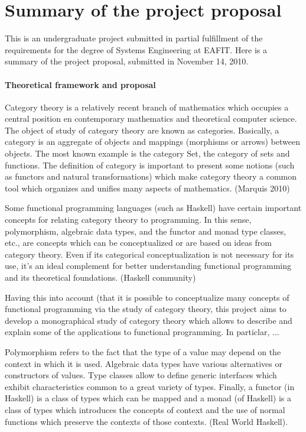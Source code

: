 \section*{Summary of the project proposal}

This is an undergraduate project submitted in partial fulfillment of
the requirements for the degree of Systems Engineering at EAFIT. Here
is a summary of the project proposal, submitted in November 14, 2010.

\paragraph{Theoretical framework and proposal}

Category theory is a relatively recent branch of mathematics which
occupies a central position en contemporary mathematics and
theoretical computer science. The object of study of category theory
are known as categories. Basically, a category is an aggregate of
objects and mappings (morphisms or arrows) between objects. The most
known example is the category Set, the category of sets and functions.
The definition of category is important to present some notions (such
as functors and natural transformations) which make category theory a
common tool which organizes and unifies many aspects of mathematics.
(Marquis 2010)

Some functional programming languages (such as Haskell) have certain
important concepts for relating category theory to programming. In
this sense, polymorphism, algebraic data types, and the functor and
monad type classes, etc., are concepts which can be conceptualized or
are based on ideas from category theory. Even if its categorical
conceptualization is not necessary for its use, it's an ideal
complement for better understanding functional programming and its
theoretical foundations. (Haskell community)

Having this into account (that it is possible to conceptualize many
concepts of functional programming via the study of category theory,
this project aims to develop a monographical study of category theory
which allows to describe and explain some of the applications to
functional programming. In particlar, ...

Polymorphism refers to the fact that the type of a value may depend on
the context in which it is used. Algebraic data types have various
alternatives or constructors of values. Type classes allow to define
generic interfaces which exhibit characteristics common to a great
variety of types. Finally, a functor (in Haskell) is a class of types
which can be mapped and a monad (of Haskell) is a class of types which
introduces the concepts of context and the use of normal functions
which preserve the contexts of those contexts. (Real World Haskell).


